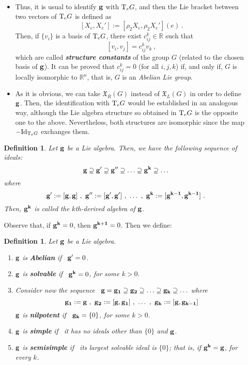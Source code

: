 \documentclass[12pt]{report}
\newtheorem{definition}[teor]{Definition}
\def\vf{\mathfrak X}
\def\Real{\mathbb{R}}
\def\Tan{{\rm T}}
\begin{document}
\begin{appendix}
\begin{itemize}
\item
Thus, it is usual to identify ${\bf g}$ with $\Tan_eG$, and then
the Lie bracket between two vectors of $\Tan_eG$ is defined as
$$
[X_e,X_e'] :=[\rho_2X_e,\rho_2X_e'](e) \ .
$$
Then, if $\{ v_i \}$ is a basis of $\Tan_eG$,
there exist $c_{ij}^k\in\Real$ such that
$$
[v_i,v_j] = c_{ij}^kv_k \ ,
$$
which are called {\sl \textbf{structure constants}}
of the group $G$ (related to the chosen basis of ${\bf g}$).
It can be proved that
$c_{ij}^k = 0$ (for all $i,j,k$)
if, and only if, $G$ is locally isomorphic to 
$\Real^n$, that is, $G$ is an {\sl Abelian Lie group}.
\item
As it is obvious, we can take $\vf_R(G)$ instead of $\vf_L(G)$ 
in order to define ${\bf g}$.
Then, the identification with $\Tan_eG$
would be established in an analogous way,
although the Lie algebra structure so obtained in $\Tan_eG$
is the opposite one to the above.
Nevertheless, both structures are isomorphic
since the map $-{\rm Id}_{\Tan_eG}$ exchanges them.
\end{itemize}

\begin{definition}
Let ${\bf g}$ be a Lie algebra.
Then, we have the following sequence of ideals:
$$
{\bf g} \supseteq {\bf g'} \supseteq {\bf g''} \supseteq \ldots 
\supseteq {\bf g^k} \supseteq \ldots
$$
where
$$
{\bf g'} := [{\bf g},{\bf g}] \ , \ 
{\bf g''} := [{\bf g'},{\bf g'}] \ , \ 
\ldots \ , \
{\bf g^k} := [{\bf g^{k-1}},{\bf g^{k-1}}] \ .
$$
Then, ${\bf g^k}$ is called the
{\rm $k$th-derived algebra} of ${\bf g}$.
\end{definition}

Observe that, if  ${\bf g^k} = 0$, then ${\bf g^{k+1}} = 0$.
Then we define:

\begin{definition}
Let ${\bf g}$ be a Lie algebra.
\begin{enumerate}
\item
${\bf g}$ is \textbf{Abelian} if \
${\bf g'} = 0$.
\item
${\bf g}$ is \textbf{solvable} if \
${\bf g^k} = 0$, for some $k>0$.
\item
Consider now the sequence \ 
${\bf g} = {\bf g_1} \supseteq {\bf g_2} \supseteq \ldots 
\supseteq {\bf g_k} \supseteq \ldots$
where
$$
{\bf g_1} := {\bf g} \ , \ 
{\bf g_2} := [{\bf g},{\bf g_1}] \ , \ 
\ldots \ , \
{\bf g_k} := [{\bf g},{\bf g_{k-1}}]
$$
${\bf g}$ is \textbf{nilpotent} if \
${\bf g_k} = \{ 0 \}$, for some $k>0$.
\item
${\bf g}$ is \textbf{simple} if \
it has no ideals other than $\{ 0 \}$ and ${\bf g}$.
\item
${\bf g}$ is \textbf{semisimple} if \
its largest solvable ideal is $\{ 0 \}$;
that is, if ${\bf g^k}={\bf g}$, for every $k$.
\end{enumerate}
\end{definition}


\end{appendix}
\end{document}
